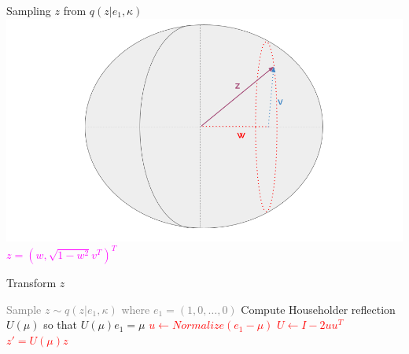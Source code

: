 \begin{frame}{Sampling $z$ from $q(z|e_1, \kappa)$}
  \centering
  \includegraphics[width=\textwidth]{figures/illustration_sampling_4.png}
  \textcolor{magenta}{$z = (w, \sqrt{1 - w^2}v^T)^T$}
\end{frame}

\begin{frame}{Transform $z$}
  \begin{algorithm}[H]
    \caption{Overview of the sampling method from $\mathcal{S}(\mu, \kappa)$}\label{alg:overviewsampling3}
    \begin{algorithmic}[1]
      \STATE \textcolor{gray}{ Sample $z \sim q(z| e_1, \kappa)$ where $e_1 = (1, 0, \dots, 0)$ }
      \STATE Compute Householder reflection $U(\mu)$ so that $U(\mu) e_1 = \mu$
      \textcolor{red}{
      \STATE $u \gets Normalize(e_1 - \mu)$ 
      \STATE $U \gets I - 2uu^T$
      \RETURN $z' = U(\mu) z$
      }
    \end{algorithmic}
    \end{algorithm}
\end{frame}